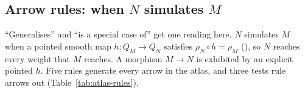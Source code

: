 \subsection{Arrow rules: when \texorpdfstring{$N$}{N} simulates \texorpdfstring{$M$}{M}}\label{sec:atlas-arrows}

``Generalises'' and ``is a special case of'' get one reading here. $N$ simulates $M$ when a pointed smooth map
$h:Q_M\to Q_N$ satisfies $\rho_N\circ h=\rho_M$ (), so $N$ reaches every weight that $M$
reaches. A morphism $M\to N$ is exhibited by an explicit pointed $h$. Five rules generate every arrow in the atlas, and
three tests rule arrows out (Table~\ref{tab:atlas-rules}).

